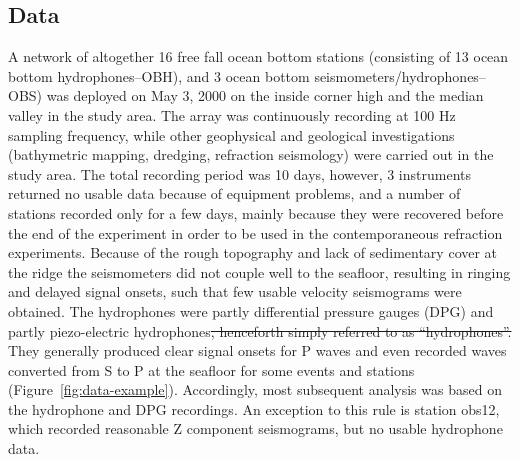 \documentclass[jgr]{agu2001}
\newlength{\tw}
\providecommand{\DIFadd}[1]{{\protect\color{blue}\uwave{#1}}} %
\providecommand{\DIFdel}[1]{{\protect\color{red}\sout{#1}}}                      %
\providecommand{\DIFaddbegin}{} %
\providecommand{\DIFaddend}{} %
\providecommand{\DIFdelbegin}{} %
\providecommand{\DIFdelend}{} %
\begin{document}
\begin{article}
\subsection{Data}

A network of altogether 16 free fall ocean bottom stations (consisting
of 13 ocean bottom hydro\-phones--OBH), and 3 ocean bottom seismometers/hydro\-phones--OBS) was deployed
on May 3, 2000 on the inside corner high and the median valley in the
study area.  The array was continuously recording at 100 Hz sampling frequency, while other
geophysical and geological investigations (bathymetric mapping,
dredging, refraction seismology) were carried out in the study area.
The total recording period was 10 days, however, 3 instruments
returned no usable data because of equipment problems, and a number of
stations recorded only for a few days, mainly because they were
recovered before the end of the experiment in order to be used in the
contemporaneous refraction experiments.  Because of the rough
topography and lack of sedimentary cover at the ridge the seismometers
did not couple well to the seafloor, resulting in ringing and delayed
signal onsets, such that few usable velocity seismograms were
obtained.  The hydrophones were partly differential pressure gauges
(DPG) and partly piezo-electric hydrophones\DIFdelbegin \DIFdel{, henceforth simply
referred to as ``hydrophones''.
}\DIFdelend \DIFaddbegin \DIFadd{.
}\DIFaddend They generally produced clear signal onsets for
P waves and even recorded waves converted from S to P at the seafloor
for some events and stations
(Figure~\ref{fig:data-example}). Accordingly, most subsequent analysis
was based on the hydrophone and DPG recordings.  An
exception to this rule is station obs12, which recorded reasonable Z
component seismograms, but no usable hydrophone data.  


\end{article}
\end{document}
